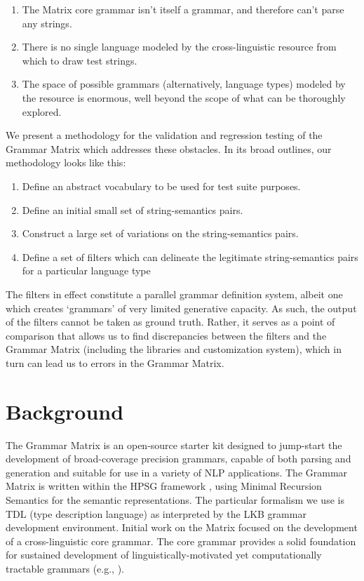 \documentclass[11pt]{article}
\begin{document}
\begin{enumerate}
\item The Matrix core grammar isn't itself a grammar, and therefore
can't parse any strings.
\item There is no single language modeled by the cross-linguistic resource
from which to draw test strings.
\item The space of possible grammars (alternatively, language types) modeled
by the resource is enormous, well beyond the scope of what can be 
thoroughly explored.
\end{enumerate}

We present a methodology for the validation and regression testing of
the Grammar Matrix which addresses these obstacles. In its broad
outlines, our methodology looks like this:

\begin{enumerate}
\item Define an abstract vocabulary to be used for test suite purposes.
\item Define an initial small set of string-semantics pairs.
\item Construct a large set of variations on the string-semantics pairs.
\item Define a set of filters which can delineate the legitimate string-semantics pairs for a particular language type
\end{enumerate}
%
The filters in effect constitute a parallel grammar definition
system, albeit one which creates `grammars' of very limited generative
capacity.  As such, the output of the filters cannot be taken as
ground truth.  Rather, it serves as a point of comparison that allows
us to find discrepancies between the filters and the Grammar Matrix
(including the libraries and customization system), which in turn
can lead us to errors in the Grammar Matrix.

\section{Background}
\label{GM}

The Grammar Matrix is an open-source starter kit designed to
jump-start the development of broad-coverage precision grammars,
capable of both parsing and generation and suitable for use in a
variety of NLP applications.  The Grammar Matrix is written within the
HPSG framework \cite{Pol:Sag:94}, using Minimal
Recursion Semantics \cite{Cop:Fli:Pol:Sag:05} for the semantic
representations. The particular formalism we use is TDL
(type description language) as interpreted by the LKB
\cite{Copestake02} grammar development environment.  Initial work on
the Matrix \cite{Ben:Fli:Oep:02,Fli:Ben:03} focused on the
development of a cross-linguistic core grammar.  The core grammar
provides a solid foundation for sustained development of
linguistically-motivated yet computationally tractable grammars (e.g.,
\cite{Hel:Hau:03,Kor:Neu:05}).  
\end{document}
